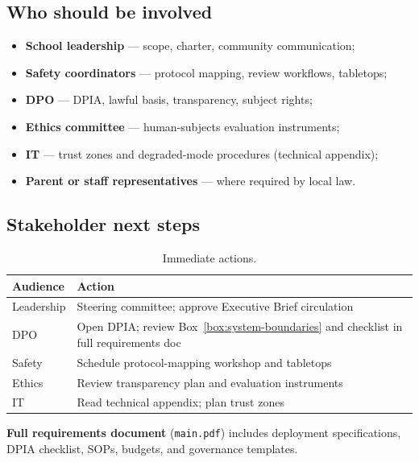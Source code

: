 \subsection{Who should be involved}

\begin{itemize}[noitemsep]
  \item \textbf{School leadership} --- scope, charter, community communication;
  \item \textbf{Safety coordinators} --- protocol mapping, review workflows, tabletops;
  \item \textbf{DPO} --- DPIA, lawful basis, transparency, subject rights;
  \item \textbf{Ethics committee} --- human-subjects evaluation instruments;
  \item \textbf{IT} --- trust zones and degraded-mode procedures (technical appendix);
  \item \textbf{Parent or staff representatives} --- where required by local law.
\end{itemize}

\subsection{Stakeholder next steps}

\begin{table}[htbp]
  \centering
  \caption{Immediate actions.}
  \label{tab:exec-next-steps}
  \small
  \begin{tabular}{@{}p{2.6cm}p{8.4cm}@{}}
    \toprule
    Audience & Action \\
    \midrule
    Leadership & Steering committee; approve Executive Brief circulation \\
    DPO & Open DPIA; review Box~\ref{box:system-boundaries} and checklist in full requirements doc \\
    Safety & Schedule protocol-mapping workshop and tabletops \\
    Ethics & Review transparency plan and evaluation instruments \\
    IT & Read technical appendix; plan trust zones \\
    \bottomrule
  \end{tabular}
\end{table}

\vspace{0.5em}
\noindent\textbf{Full requirements document} (\texttt{main.pdf}) includes deployment specifications,
DPIA checklist, SOPs, budgets, and governance templates.
